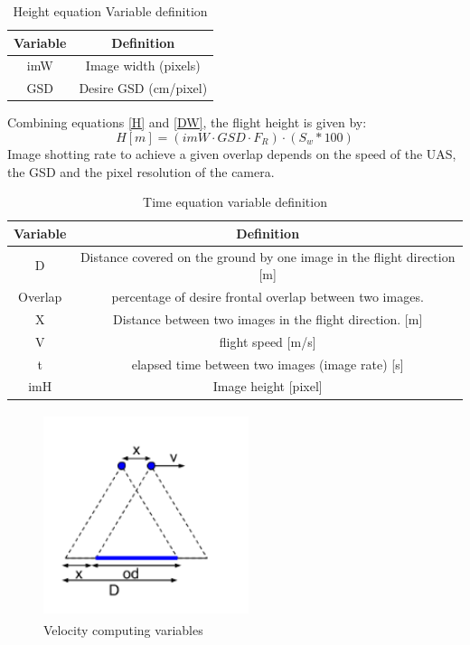 \begin{table}[H]
\centering
\begin{tabular}{|c|c|}
\hline
\textbf{Variable} & \textbf{Definition}   \\ \hline
imW              & Image width (pixels)  \\ \hline
GSD               & Desire GSD (cm/pixel) \\ \hline
\end{tabular}
\caption{Height equation Variable definition}
\end{table}
Combining equations \ref{H} and \ref{DW}, the flight height is given by:
\begin{equation}
H[m]=(imW\cdot GSD \cdot F_{R})\cdot (S_{w}*100)
\end{equation}
Image shotting rate to achieve a given overlap depends on the speed of the UAS, the GSD and the pixel resolution of the camera.
\begin{table}[H]
\centering
\begin{tabular}{|c|c|}
\hline
Variable & Definition                                                                  \\ \hline
D        & Distance covered on the ground by one image in the flight direction {[}m{]} \\ \hline
Overlap  & percentage of desire frontal overlap between two images.                    \\ \hline
X        & Distance between two images in the flight direction. {[}m{]}                \\ \hline
V        & flight speed {[}m/s{]}                                                      \\ \hline
t        & elapsed time between two images (image rate) {[}s{]}                        \\ \hline
imH      & Image height {[}pixel{]}                                                    \\ \hline
\end{tabular}
\caption{Time equation variable definition}
\end{table}
\begin{figure}[H]
\centering
\includegraphics[width=6cm,height=6cm,keepaspectratio]{imagenes/velocity.PNG}
\caption{Velocity computing variables}
\label{fig:velocity}
\end{figure}
